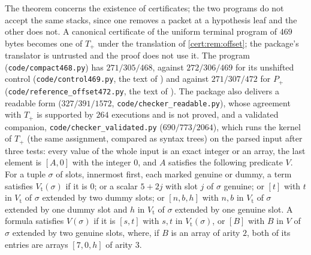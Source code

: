 The theorem concerns the existence of certificates; the two programs do not
accept the same stacks, since one removes a packet at a hypothesis leaf and the
other does not. A canonical certificate of the uniform terminal program of
$469$ bytes becomes one of $T_{+}$ under the translation of
\cref{cert:rem:offset}; the package's translator is untrusted and the proof
does not use it. The program (\texttt{code/compact468.py}) has $271/305/468$,
against $272/306/469$ for its unshifted control (\texttt{code/control469.py},
the text of ) and against $271/307/472$ for $P_{+}$
(\texttt{code/reference\_offset472.py}, the text of ). The package
also delivers a readable form ($327/391/1572$, \texttt{code/checker\_readable.py}),
whose agreement with $T_{+}$ is supported by $264$ executions and is not proved,
and a validated companion, \texttt{code/checker\_validated.py}
($690/773/2064$), which runs the kernel of $T_{+}$ (the same assignment, compared
as syntax trees) on the parsed input after three tests: every value of the whole
input is an exact integer or an array, the last element is $[A,0]$ with the
integer $0$, and $A$ satisfies the following predicate $V$. For a tuple $\sigma$
of slots, innermost first, each marked genuine or dummy, a term satisfies
$V_{\mathrm t}(\sigma)$ if it is $0$; or a scalar $5+2j$ with slot $j$ of $\sigma$
genuine; or $[t]$ with $t$ in $V_{\mathrm t}$ of $\sigma$ extended by two dummy
slots; or $[n,b,h]$ with $n,b$ in $V_{\mathrm t}$ of $\sigma$ extended by one dummy
slot and $h$ in $V_{\mathrm t}$ of $\sigma$ extended by one genuine slot. A
formula satisfies $V(\sigma)$ if it is $[s,t]$ with $s,t$ in $V_{\mathrm t}(\sigma)$,
or $[B]$ with $B$ in $V$ of $\sigma$ extended by two genuine slots, where, if $B$
is an array of arity $2$, both of its entries are arrays $[7,0,h]$ of arity $3$.

